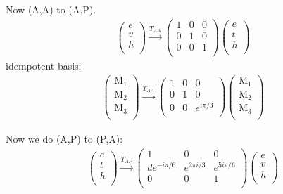 \documentclass[12pt,a4paper]{article}
\newcounter{arrow}
\begin{document}
Now (A,A) to (A,P).
\begin{align}
\left( \begin{matrix}
e\\
v\\
h\\
\end{matrix} \right)
\xrightarrow{T_{AA}}
\left(\begin{matrix} 
1 & 0 &0 \\
0 & 1 & 0 \\
0 & 0 & 1\\
\end{matrix} \right)
\left( \begin{matrix}
e\\
t\\
h\\
\end{matrix} \right)
\end{align}
idempotent basis:
\begin{align}
\left( \begin{matrix}
\text{M}_1\\
\text{M}_2\\
\text{M}_3\\
\end{matrix} \right) 
\xrightarrow{T_{AA}} 
\left(\begin{matrix} 
1 & 0 &0 \\
0 & 1 & 0 \\
0 & 0 & e^{i \pi /3} \\
\end{matrix} \right)
\left( \begin{matrix}
\text{M}_1\\
\text{M}_2\\
\text{M}_3\\
\end{matrix} \right)
\end{align}

Now we do (A,P) to (P,A):
\begin{align}
\left( \begin{matrix}
e\\
t\\
h\\
\end{matrix} \right)
\xrightarrow{T_{AP}}
\left(\begin{matrix} 
1 & 0 &0 \\
de^{-i \pi /6} &e^{2\pi i /3} &e^{5 i \pi /6} \\
0 & 0 & 1\\
\end{matrix} \right)
\left( \begin{matrix}
e\\
v\\
h\\
\end{matrix} \right)
\end{align}
\end{document}
